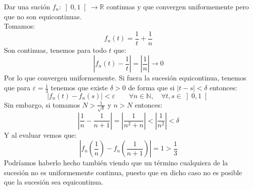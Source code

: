 \begin{ejercicio}
    Dar una sución $f_n:\left]0,1\right[\to \mathbb{R}$ continuas y que convergen uniformemente pero que no son equicontinuas.\\

    \noindent
    Tomamos:
    \begin{equation*}
        f_n(t) = \frac{1}{t} + \frac{1}{n}
    \end{equation*}
    Son continuas, tenemos para todo $t$ que:
    \begin{equation*}
        \left|f_n(t)-\frac{1}{t}\right| = \left|\frac{1}{n}\right|\to 0
    \end{equation*}
    Por lo que convergen uniformemente. Si fuera la sucesión equicontinua, tenemos que para $\varepsilon=\frac{1}{3}$ tenemos que existe $\delta>0$ de forma que si $|t-s|<\delta$ entonces:
    \begin{equation*}
        |f_n(t)-f_n(s)| < \varepsilon\qquad \forall n\in \mathbb{N}, \quad \forall t,s\in \left]0,1\right[
    \end{equation*}
    Sin embargo, si tomamos $N>\frac{1}{\sqrt{\delta}}$ y $n>N$ entonces:
    \begin{equation*}
        \left|\frac{1}{n}-\frac{1}{n+1}\right| = \left|\frac{1}{n^2+n}\right| < \left|\frac{1}{n^2}\right| < \delta
    \end{equation*}
    Y al evaluar vemos que:
    \begin{equation*}
        \left|f_n\left(\frac{1}{n}\right) - f_n\left(\frac{1}{n+1}\right)\right| = 1 > \frac{1}{3}
    \end{equation*}
    Podríamos haberlo hecho también viendo que un término cualquiera de la sucesión no es uniformemente continua, puesto que en dicho caso no es posible que la sucesión sea equicontinua.
\end{ejercicio}


